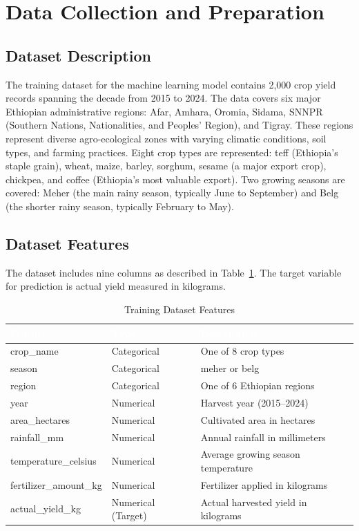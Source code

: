 \documentclass[12pt,a4paper,oneside]{report}
\begin{document}
\section{Data Collection and Preparation}
\subsection{Dataset Description}
The training dataset for the machine learning model contains 2,000 crop yield records spanning the decade from 2015 to 2024. The data covers six major Ethiopian administrative regions: Afar, Amhara, Oromia, Sidama, SNNPR (Southern Nations, Nationalities, and Peoples' Region), and Tigray. These regions represent diverse agro-ecological zones with varying climatic conditions, soil types, and farming practices. Eight crop types are represented: teff (Ethiopia's staple grain), wheat, maize, barley, sorghum, sesame (a major export crop), chickpea, and coffee (Ethiopia's most valuable export). Two growing seasons are covered: Meher (the main rainy season, typically June to September) and Belg (the shorter rainy season, typically February to May).

\subsection{Dataset Features}
The dataset includes nine columns as described in Table~\ref{tab:features}. The target variable for prediction is actual yield measured in kilograms.

\begin{table}[H]
\centering
\caption{Training Dataset Features}
\label{tab:features}
\renewcommand{\arraystretch}{1.4}
\begin{tabularx}{\textwidth}{XXl}
\toprule
\rowcolor{headerblue}
\textcolor{white}{\textbf{Feature}} & \textcolor{white}{\textbf{Type}} & \textcolor{white}{\textbf{Description}} \\
\midrule
crop\_name & Categorical & One of 8 crop types \\
\rowcolor{rowalt}
season & Categorical & meher or belg \\
region & Categorical & One of 6 Ethiopian regions \\
\rowcolor{rowalt}
year & Numerical & Harvest year (2015--2024) \\
area\_hectares & Numerical & Cultivated area in hectares \\
\rowcolor{rowalt}
rainfall\_mm & Numerical & Annual rainfall in millimeters \\
temperature\_celsius & Numerical & Average growing season temperature \\
\rowcolor{rowalt}
fertilizer\_amount\_kg & Numerical & Fertilizer applied in kilograms \\
actual\_yield\_kg & Numerical (Target) & Actual harvested yield in kilograms \\
\bottomrule
\end{tabularx}
\end{table}
\end{document}
